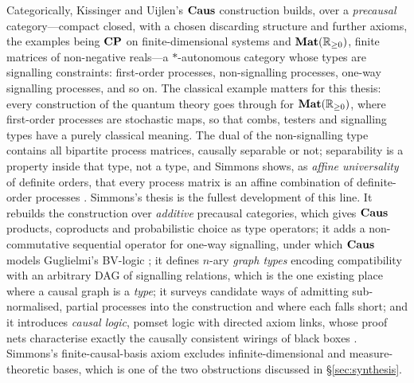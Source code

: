 Categorically, Kissinger and Uijlen's $\mathbf{Caus}$ construction \cite{kissinger2019categorical} builds, over a \emph{precausal} category---compact closed, with a chosen discarding structure and further axioms, the examples being $\mathbf{CP}$ on finite-dimensional systems and $\mathbf{Mat}(\mathbb{R}_{\geq 0})$, finite matrices of non-negative reals---a $*$-autonomous category whose types are signalling constraints: first-order processes, non-signalling processes, one-way signalling processes, and so on. The classical example matters for this thesis: every construction of the quantum theory goes through for $\mathbf{Mat}(\mathbb{R}_{\geq 0})$, where first-order processes are stochastic maps, so that combs, testers and signalling types have a purely classical meaning. The dual of the non-signalling type contains all bipartite process matrices, causally separable or not; separability is a property inside that type, not a type, and Simmons shows, as \emph{affine universality} of definite orders, that every process matrix is an affine combination of definite-order processes \cite{simmons2024thesis}. Simmons's thesis \cite{simmons2024thesis} is the fullest development of this line. It rebuilds the construction over \emph{additive} precausal categories, which gives $\mathbf{Caus}$ products, coproducts and probabilistic choice as type operators; it adds a non-commutative sequential operator for one-way signalling, under which $\mathbf{Caus}$ models Guglielmi's BV-logic \cite{simmons2022bv}; it defines $n$-ary \emph{graph types} encoding compatibility with an arbitrary DAG of signalling relations, which is the one existing place where a causal graph is a \emph{type}; it surveys candidate ways of admitting sub-normalised, partial processes into the construction and where each falls short; and it introduces \emph{causal logic}, pomset logic with directed axiom links, whose proof nets characterise exactly the causally consistent wirings of black boxes \cite{simmons2024thesis,simmons2024completelogic}. Simmons's finite-causal-basis axiom excludes infinite-dimensional and measure-theoretic bases, which is one of the two obstructions discussed in \S\ref{sec:synthesis}.

